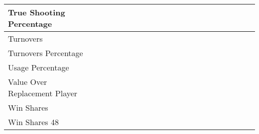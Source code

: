 \documentclass{article}
\def \cm{\checkmark}
\begin{document}
\begin{table}[ht]
\begin{tabular}{lccccccccccccccccccccc}
            \midrule
            True Shooting Percentage            &     &     &     & \cm & \cm & \cm & \cm & \cm & \cm & \cm & \cm & \cm & \cm & \cm & \cm & \cm & \cm & \cm & \cm & \cm & \cm \\
            \midrule
            Turnovers                           &     &     &     &     &     &     &     &     &     &     &     &     &     &     & \cm & \cm & \cm & \cm & \cm & \cm & \cm \\
            \midrule
            Turnovers Percentage                &     &     &     &     &     &     &     &     &     &     &     &     &     &     &     &     & \cm & \cm & \cm & \cm & \cm \\
            \midrule
            Usage Percentage                    &     &     &     &     &     &     &     &     &     &     &     &     &     &     &     & \cm & \cm & \cm & \cm & \cm & \cm \\
            \midrule
            Value Over Replacement Player       &     &     &     &     &     &     &     &     &     &     &     &     & \cm & \cm & \cm & \cm & \cm & \cm & \cm & \cm & \cm \\
            \midrule
            Win Shares                          &     &     & \cm & \cm & \cm & \cm & \cm & \cm & \cm & \cm & \cm & \cm & \cm & \cm & \cm & \cm & \cm & \cm & \cm & \cm & \cm \\
            \midrule
            Win Shares 48                       &     &     &     &     &     &     &     &     & \cm & \cm & \cm & \cm & \cm & \cm & \cm & \cm & \cm & \cm & \cm & \cm & \cm \\
            \bottomrule
        \end{tabular}
    \end{table}
\end{document}
